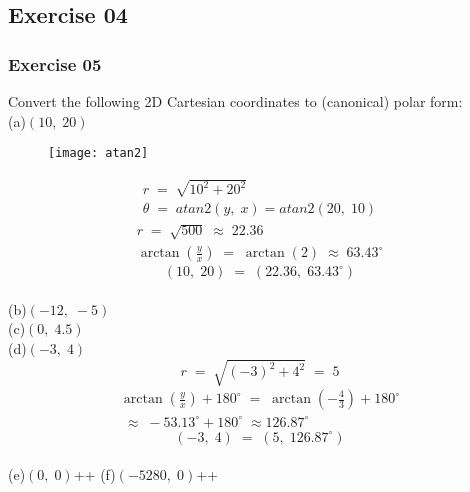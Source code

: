 \documentclass[12pt, a4paper]{article}
\begin{document}
\subsection*{Exercise 04}
\newpage\quad
\subsubsection*{Exercise 05}

Convert the following 2D Cartesian coordinates to
(canonical) polar form:\\
	
	(a)\quad$(10,\;20)$
		\begin{figure}[h]
			\centering
			\texttt{[image: atan2]}
		\end{figure}
		
		\begin{gather}
			\tag*{}
				r\;=\;\sqrt{10^2 + 20^2} \\
			\tag*{}
				\theta\;=\;atan2(y,\;x)=atan2(20,\;10)
		\end{gather}
		\begin{gather}
			\tag*{}
				r\;=\;\sqrt{500}\;\approx\;22.36\\
			\tag*{}
				\arctan\left(\frac{y}{x}\right)\;=\;
				\arctan(2)\;\approx\;63.43^\circ
		\end{gather}
		\begin{equation}
			\tag*{}
				(10,\;20)\;=\;(22.36,\;63.43^\circ)
		\end{equation}\\
	(b)\quad$(-12,\;-5)$\\
	(c)\quad$(0,\;4.5)$\\
	(d)\quad$(-3,\;4)$\\
		\begin{equation}
			\tag*{}
				r\;=\;\sqrt{(-3)^2+4^2}\;=\;5
		\end{equation}
		\begin{gather}
			\tag*{}
				\arctan\left(\frac{y}{x}\right)+180^\circ\;=\;
				\arctan\left(-\frac{4}{3}\right)+180^\circ\\
			\tag*{}
				\;\approx\;-53.13^\circ+180^\circ
				\;\approx126.87^\circ
		\end{gather}
		\begin{equation}
			\tag*{}
				(-3,\;4)\;=\;(5,\;126.87^\circ)
		\end{equation}\\
	(e)\quad$(0,\;0)$++
	(f)\quad$(-5280,\;0)$++
	
\newpage\quad
\end{document}
